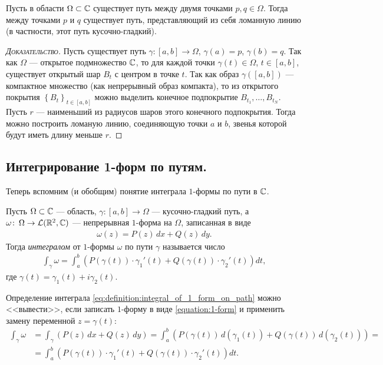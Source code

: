 \documentclass[../complex-analysis.tex]{subfiles}
\begin{document}
\begin{prop}
 \label{prop:smooth_path_existance}
 Пусть в области $ \Omega \subset \mathbb{C} $ существует путь между двумя точками $ p, q\in\Omega $. Тогда между точками $ p $ и $ q $ существует путь, представляющий из себя ломанную линию (в частности, этот путь кусочно-гладкий).
\end{prop}
\begin{proof}[\normalfont\textsc{Доказательство}]
 Пусть существует путь $ \gamma\colon[a,b]\to\Omega $, $ \gamma(a) = p $, $ \gamma(b)=q $. Так как $ \Omega $ --- открытое подмножество $ \mathbb{C} $, то для каждой точки $ \gamma(t) \in \Omega $, $ t \in [a,b] $, существует открытый шар $ B_t $ с центром в точке $ t $. Так как образ $ \gamma([a,b]) $ --- компактное множество (как непрерывный образ компакта), то из открытого покрытия $ \left\{B_t\right\}_{t \in [a,b]} $  можно выделить конечное подпокрытие $ B_{t_1}, \ldots, B_{t_N} $. Пусть $ r $ --- наименьший из радиусов шаров этого конечного подпокрытия. Тогда можно построить ломаную линию, соединяющую точки $ a $ и $ b $, звенья которой будут иметь длину меньше $ r $.
\end{proof}

\subsection{Интегрирование 1-форм по путям.}

Теперь вспомним (и обобщим) понятие интеграла $1$-формы по пути в $\mathbb{C}$.

\begin{df}
 Пусть $\Omega \subset \mathbb{C}$ --- область, $\gamma \colon [a,b] \to \Omega$ --- кусочно-гладкий путь, а $\omega \colon\, \Omega \to \mathcal{L}(\mathbb{R}^2, \mathbb{C})$ --- непрерывная $1$-форма на $ \Omega $, записанная в виде
 \begin{align*}
  \omega(z) = P(z)\,dx + Q(z)\,dy.
 \end{align*} Тогда \textit{интегралом} от $1$-формы $\omega$ по пути  $\gamma$ называется число
 \begin{align}
  \label{eq:definition:integral_of_1_form_on_path}
  \int_{\gamma} \omega = \int_{a}^{b} \left( P(\gamma(t)) \cdot \gamma_1'(t) + Q(\gamma(t)) \cdot \gamma_2'(t) \right) dt,
 \end{align} где $\gamma(t) = \gamma_1(t) + i \gamma_2(t)$.
\end{df}
\begin{remrk*}
 Определение интеграла \eqref{eq:definition:integral_of_1_form_on_path} можно <<вывести>>, если записать $ 1 $-форму в виде \eqref{equation:1-form} и применить замену переменной $ z = \gamma(t) $:
 \begin{align*}
  \int_{\gamma} \omega &= \int_{\gamma} \left( P(z)\,dx + Q(z)\,dy \right) = \int_{a}^{b} (P(\gamma(t)) \, d (\gamma_1(t)) + Q(\gamma(t)) \, d(\gamma_2(t))) = \\
  &= \int_{a}^{b} \left( P(\gamma(t)) \cdot \gamma_1'(t) + Q(\gamma(t)) \cdot \gamma_2'(t)\right)dt.
 \end{align*}
\end{remrk*}
\end{document}
